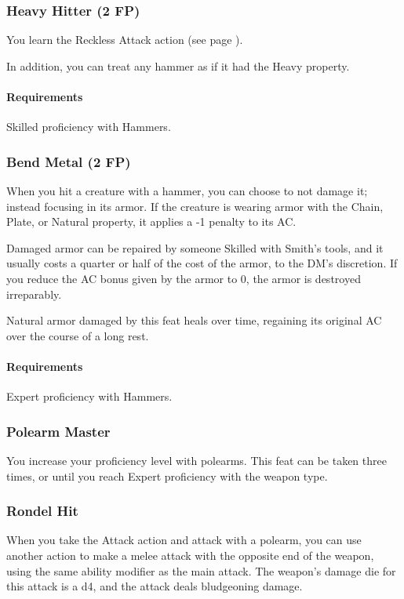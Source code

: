 \subsubsection{Heavy Hitter (2 FP)} \label{feat::heavyhitter}
    You learn the Reckless Attack action (see page \pageref{act::recklessattack}).

    In addition, you can treat any hammer as if it had the Heavy property.
    \paragraph{Requirements} Skilled proficiency with Hammers.
\subsubsection{Bend Metal (2 FP)} \label{feat::bendmetal}
    When you hit a creature with a hammer, you can choose to not damage it; instead focusing in its armor.
    If the creature is wearing armor with the Chain, Plate, or Natural property, it applies a -1 penalty to its AC.

    Damaged armor can be repaired by someone Skilled with Smith's tools, and it usually costs a quarter or half of the cost of the armor, to the DM's discretion.
    If you reduce the AC bonus given by the armor to 0, the armor is destroyed irreparably.

    Natural armor damaged by this feat heals over time, regaining its original AC over the course of a long rest.
    \paragraph{Requirements} Expert proficiency with Hammers.
\subsubsection{Polearm Master} \label{feat::polearmmaster}
    You increase your proficiency level with polearms.
    This feat can be taken three times, or until you reach Expert proficiency with the weapon type.
\subsubsection{Rondel Hit} \label{feat::rondelhit}
    When you take the Attack action and attack with a polearm, you can use another action to make a melee attack with the opposite end of the weapon, using the same ability modifier as the main attack.
    The weapon's damage die for this attack is a d4, and the attack deals bludgeoning damage.

